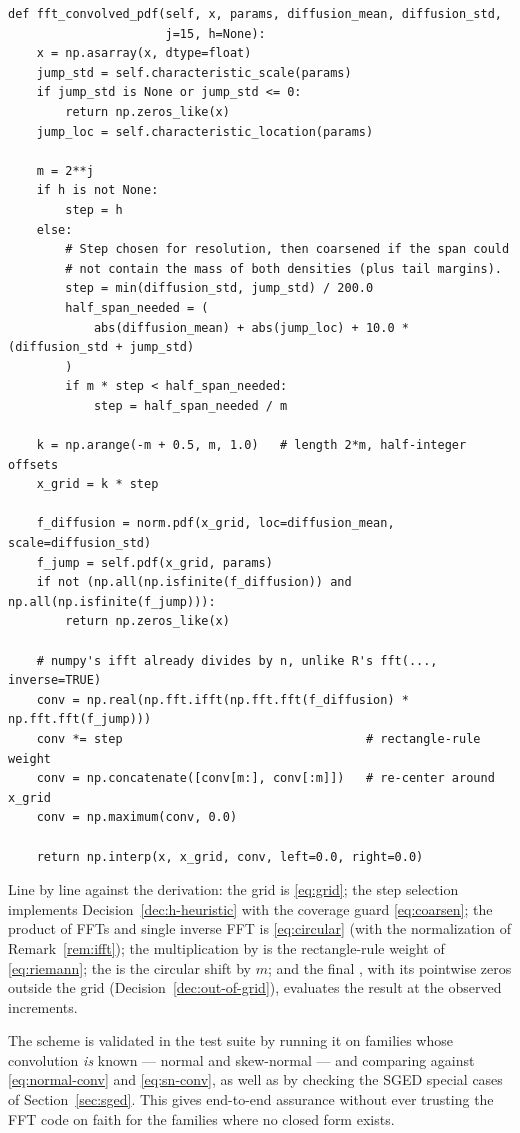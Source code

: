 \begin{lstlisting}[caption={The full FFT convolution in \code{distributions/base.py}.}]
def fft_convolved_pdf(self, x, params, diffusion_mean, diffusion_std,
                      j=15, h=None):
    x = np.asarray(x, dtype=float)
    jump_std = self.characteristic_scale(params)
    if jump_std is None or jump_std <= 0:
        return np.zeros_like(x)
    jump_loc = self.characteristic_location(params)

    m = 2**j
    if h is not None:
        step = h
    else:
        # Step chosen for resolution, then coarsened if the span could
        # not contain the mass of both densities (plus tail margins).
        step = min(diffusion_std, jump_std) / 200.0
        half_span_needed = (
            abs(diffusion_mean) + abs(jump_loc) + 10.0 * (diffusion_std + jump_std)
        )
        if m * step < half_span_needed:
            step = half_span_needed / m

    k = np.arange(-m + 0.5, m, 1.0)   # length 2*m, half-integer offsets
    x_grid = k * step

    f_diffusion = norm.pdf(x_grid, loc=diffusion_mean, scale=diffusion_std)
    f_jump = self.pdf(x_grid, params)
    if not (np.all(np.isfinite(f_diffusion)) and np.all(np.isfinite(f_jump))):
        return np.zeros_like(x)

    # numpy's ifft already divides by n, unlike R's fft(..., inverse=TRUE)
    conv = np.real(np.fft.ifft(np.fft.fft(f_diffusion) * np.fft.fft(f_jump)))
    conv *= step                                  # rectangle-rule weight
    conv = np.concatenate([conv[m:], conv[:m]])   # re-center around x_grid
    conv = np.maximum(conv, 0.0)

    return np.interp(x, x_grid, conv, left=0.0, right=0.0)
\end{lstlisting}

Line by line against the derivation: the grid is \eqref{eq:grid}; the
step selection implements Decision~\ref{dec:h-heuristic} with the
coverage guard \eqref{eq:coarsen}; the product of FFTs and single inverse
FFT is \eqref{eq:circular} (with the normalization of
Remark~\ref{rem:ifft}); the multiplication by  is the
rectangle-rule weight of \eqref{eq:riemann}; the  is the
circular shift by $m$; and the final , with its pointwise
zeros outside the grid (Decision~\ref{dec:out-of-grid}), evaluates the
result at the observed increments.

\begin{remark}
The scheme is validated in the test suite by running it on families whose
convolution \emph{is} known --- normal and skew-normal --- and comparing
against \eqref{eq:normal-conv} and \eqref{eq:sn-conv}, as well as by
checking the SGED special cases of Section~\ref{sec:sged}. This gives
end-to-end assurance without ever trusting the FFT code on faith for the
families where no closed form exists.
\end{remark}
